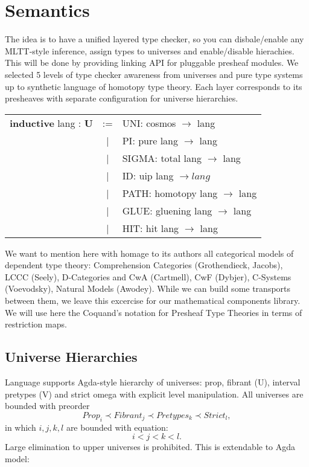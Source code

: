 \documentclass[a4paper,UKenglish,cleveref, autoref, thm-restate]{lipics-v2021}
\newcommand{\tabstyle}[0]{\scriptsize\ttfamily\fontseries{l}\selectfont}
\begin{document}
\newpage
\section{Semantics}
The idea is to have a unified layered type checker, so you can disbale/enable any MLTT-style inference,
assign types to universes and enable/disable hierachies. This will be done by providing linking API for
pluggable presheaf modules. We selected 5 levels of type checker awareness from universes and pure type
systems up to synthetic language of homotopy type theory. Each layer corresponds to its presheaves with
separate configuration for universe hierarchies.
\begin{table}[ht]
\tabstyle
\begin{tabular}{rcl}
 \textbf{inductive} lang : \textbf{U} & := & UNI: cosmos $\rightarrow$ lang \\
   & | & PI: pure lang $\rightarrow$ lang \\
   & | & SIGMA: total lang $\rightarrow$ lang \\
   & | & ID: uip lang $\rightarrow lang$ \\
   & | & PATH: homotopy lang $\rightarrow$ lang \\
   & | & GLUE: gluening lang $\rightarrow$ lang \\
   & | & HIT: hit lang $\rightarrow$ lang \\
\end{tabular}
\end{table}
We want to mention here with homage to its authors all categorical models of dependent type theory:
Comprehension Categories (Grothendieck, Jacobs), LCCC (Seely), D-Categories and CwA (Cartmell),
CwF (Dybjer), C-Systems (Voevodsky), Natural Models (Awodey). While we can build some transports
between them, we leave this excercise for our mathematical components library.
We will use here the Coquand's notation for Presheaf Type Theories in terms of restriction maps.

\subsection{Universe Hierarchies}

Language supports Agda-style hierarchy of universes: prop, fibrant (U), interval pretypes (V) and
strict omega with explicit level manipulation. All universes are bounded with preorder
\begin{equation}
Prop_i \prec Fibrant_j \prec Pretypes_k \prec Strict_l,
\end{equation}
in which $i,j,k,l$ are bounded with equation:
\begin{equation}
i < j < k < l.
\end{equation}
Large elimination to upper universes is prohibited. This is extendable to Agda model:
\end{document}
